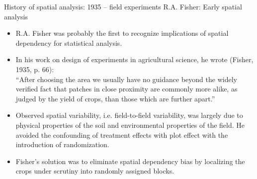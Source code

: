 \documentclass{beamer}
\begin{document}
\begin{frame}{History of spatial analysis: 1935 -- field experiments}
 R.A. Fisher: Early spatial analysis\\
\medskip
\begin{itemize}
    \item R.A. Fisher was probably the first to recognize implications of spatial dependency for statistical analysis.
    \smallskip
    \item In his work on design of experiments in agricultural science, he wrote (Fisher, 1935, p. 66):\\
    ``After choosing the area we usually have no guidance beyond the widely verified fact that patches in close proximity are commonly more alike, as judged by the yield of crops, than those which are further apart.''
    \smallskip
    \item Observed spatial variability, i.e. field-to-field variability, was largely due to physical properties of the soil and environmental properties of the field. He avoided the confounding of treatment effects with plot effect with the introduction of randomization.
    \smallskip
    \item Fisher's solution was to eliminate spatial dependency bias by localizing the crops under scrutiny into randomly assigned blocks.
\end{itemize}
\end{frame}
\end{document}
